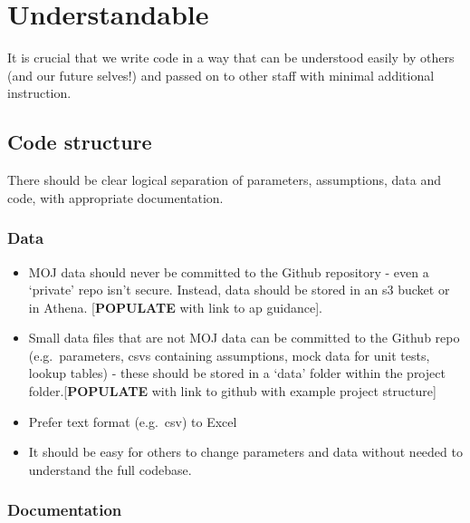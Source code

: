 \documentclass[]{book}
\begin{document}
\hypertarget{understand}{%
\chapter{Understandable}\label{understand}}

It is crucial that we write code in a way that can be understood easily by others (and our future selves!) and passed on to other staff with minimal additional instruction.

\hypertarget{structure2}{%
\section{Code structure}\label{structure2}}

There should be clear logical separation of parameters, assumptions, data and code, with appropriate documentation.

\hypertarget{data}{%
\subsection*{Data}\label{data}}

\begin{itemize}
\item
  MOJ data should never be committed to the Github repository - even a `private' repo isn't secure. Instead, data should be stored in an s3 bucket or in Athena. {[}\textbf{POPULATE} with link to ap guidance{]}.
\item
  Small data files that are not MOJ data can be committed to the Github repo (e.g.~parameters, csvs containing assumptions, mock data for unit tests, lookup tables) - these should be stored in a `data' folder within the project folder.{[}\textbf{POPULATE} with link to github with example project structure{]}
\item
  Prefer text format (e.g.~csv) to Excel\\
\item
  It should be easy for others to change parameters and data without needed to understand the full codebase.
\end{itemize}

\hypertarget{readme}{%
\subsection*{Documentation}\label{readme}}
\end{document}
